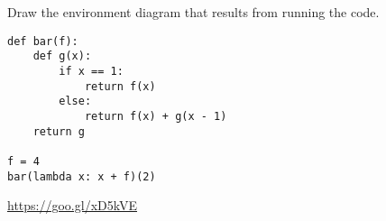 \begin{blocksection}
\question Draw the environment diagram that results from running the code.

\begin{lstlisting}
def bar(f):
    def g(x):
        if x == 1:
            return f(x)
        else:
            return f(x) + g(x - 1)
    return g

f = 4
bar(lambda x: x + f)(2)
\end{lstlisting}

\begin{solution}[2in]
\url{https://goo.gl/xD5kVE}
\end{solution}
\end{blocksection}
